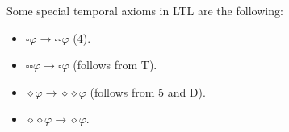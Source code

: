 Some special temporal axioms in LTL are the following:
\begin{itemize}
    \item $\square\varphi \rightarrow \square\square\varphi$ (4).
    \item $\square\square\varphi \rightarrow \square\varphi$ (follows from T).
    \item $\diamond\varphi \rightarrow \diamond\diamond\varphi$ (follows from 5 and D). 
    \item $\diamond\diamond\varphi \rightarrow \diamond\varphi$.
\end{itemize}

